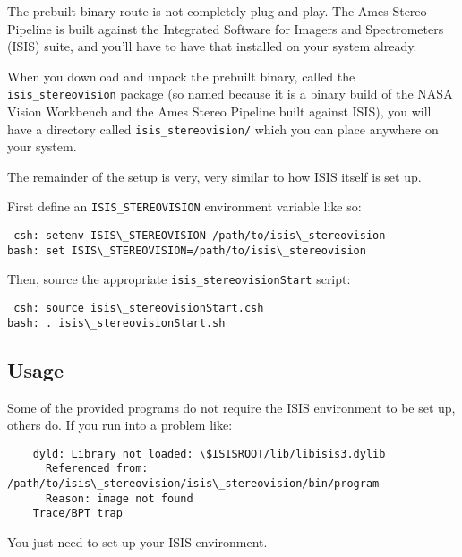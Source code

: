 The prebuilt binary route is not completely plug and play.  The
Ames Stereo Pipeline is built against the Integrated Software for
Imagers and Spectrometers (ISIS) suite, and you'll have to have
that installed on your system already.

When you download and unpack the prebuilt binary, called the
\texttt{isis\_stereovision} package (so named because it is a binary
build of the NASA Vision Workbench and the Ames Stereo Pipeline
built against ISIS), you will have a directory called
\texttt{isis\_stereovision/} which you can place anywhere on your
system.

The remainder of the setup is very, very similar to how ISIS itself
is set up.

First define an \texttt{ISIS\_STEREOVISION} environment variable like so:
\begin{verbatim}
 csh: setenv ISIS\_STEREOVISION /path/to/isis\_stereovision
bash: set ISIS\_STEREOVISION=/path/to/isis\_stereovision
\end{verbatim}

Then, source the appropriate \texttt{isis\_stereovisionStart} script:
\begin{verbatim}
 csh: source isis\_stereovisionStart.csh
bash: . isis\_stereovisionStart.sh
\end{verbatim}

\subsection*{Usage}

Some of the provided programs do not require the ISIS environment
to be set up, others do.  If you run into a problem like:
\begin{verbatim}
    dyld: Library not loaded: \$ISISROOT/lib/libisis3.dylib
      Referenced from: /path/to/isis\_stereovision/isis\_stereovision/bin/program
      Reason: image not found
    Trace/BPT trap
\end{verbatim}

You just need to set up your ISIS environment.

